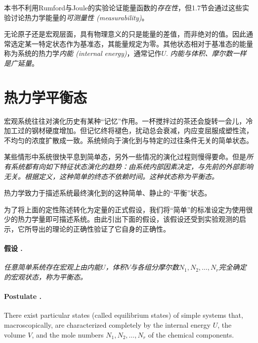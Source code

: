 本书不利用Rumford与Joule的实验论证能量函数的{\it 存在性}，但1.7节会通过这些实验讨论热力学能量的{\it 可测量性 (measurability)}。

无论原子还是宏观层面，具有物理意义的只是能量的差值，而非绝对的值。因此通常选定某一特定状态作为基准态，其能量规定为零。其他状态相对于基准态的能量称为系统的热力学{\it 内能 (internal energy)}，通常记作$U$. {\it 内能与体积、摩尔数一样是广延量}。

\section{热力学平衡态}
\label{sec1.5}

宏观系统往往对演化历史有某种“记忆”作用。一杯搅拌过的茶还会旋转一会儿，冷加工过的钢材硬度增加。但记忆终将褪色，扰动总会衰减，内应变屈服成塑性流，不均匀的浓度扩散成一致。系统倾向于演化到与特定的过往条件无关的简单状态。

某些情形中系统很快平息到简单态，另外一些情况的演化过程则慢得要命。但是{\it 所有系统都有向如下特征状态演化的趋势：由系统内部因素决定，与先前的外部影响无关。根据定义，这种简单的终态不依赖时间。这种状态称为平衡态。}

热力学致力于描述系统最终演化到的这种简单、静止的“平衡”状态。

为了将上面的定性陈述转化为定量的正式假设，我们将“简单”的标准设定为使用很少的热力学量即可描述系统。由此引出下面的假设，该假设还受到实验观测的启示，它所导出的理论的正确性验证了它自身的正确性。

\paragraph{假设 \uppercase\expandafter{}.}
{\it 任意简单系统存在宏观上由内能$U$，体积$V$与各组分摩尔数$N_1, N_2, \dots, N_r$完全确定的宏观状态，称为平衡态。}

\paragraph{Postulate \uppercase\expandafter{}.}
There exist particular states (called equilibrium states) of simple systems that, macroscopically, are characterized completely by the internal energy $U$, the volume $V$, and the mole numbers $N_1, N_2, \dots, N_r$ of the chemical components. 

